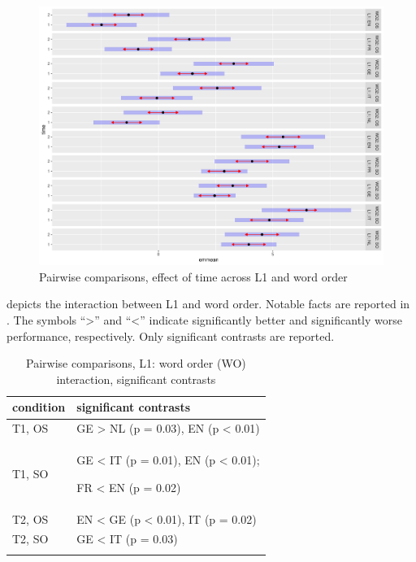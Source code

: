 \begin{figure}
    \includegraphics[width=\textwidth]{figures/05-3.pdf}
    \caption{Pairwise comparisons, effect of time across L1 and word order}
    \label{fig:05:3}
\end{figure}

 depicts the interaction between L1 and word order. Notable facts are reported in . The symbols “>” and “<” indicate significantly better and significantly worse performance, respectively. Only significant contrasts are reported.

\begin{table}
    \begin{tabularx}{\textwidth}{ll}
    \lsptoprule
    condition & significant contrasts\\
    \midrule
    T1, OS & GE > NL (p = 0.03), EN (p < 0.01)\\
    T1, SO & GE < IT (p = 0.01), EN (p < 0.01);
    
    FR < EN (p = 0.02)\\
    T2, OS & EN < GE (p < 0.01), IT (p = 0.02)\\
    T2, SO & GE < IT (p = 0.03)\\
    \lspbottomrule
    \end{tabularx}
    \caption{Pairwise comparisons, L1: word order (WO) interaction, significant contrasts}
    \label{tab:05:5}
\end{table}

